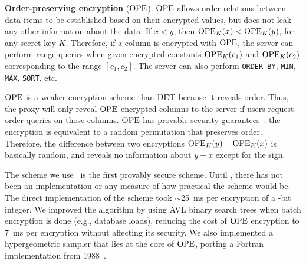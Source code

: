 \textbf{Order-preserving encryption} ($\textrm{OPE}$)\@. $\textrm{OPE}$ allows order
relations between data items to be established based on their
encrypted values, but does not leak any other information about the
data. If $x < y$, then $\textrm{OPE}_K(x) < \textrm{OPE}_K(y)$, for any secret key $K$\@.
Therefore, if a column is encrypted with $\textrm{OPE}$, the server can
perform range queries when given encrypted constants $\textrm{OPE}_K(c_1)$ and
$\textrm{OPE}_K(c_2)$ corresponding to the range $[c_1, c_2]$.  The server can
also perform {\tt ORDER BY}, {\tt MIN}, {\tt MAX}, {\tt SORT}, etc.

$\textrm{OPE}$ is a weaker encryption scheme than $\textrm{DET}$ because it reveals
order.  Thus, the \name{} proxy will only reveal $\textrm{OPE}$-encrypted
columns to the server if users request order queries on those
columns. $\textrm{OPE}$ has provable security guarantees~\cite{boldyreva-ope}: the encryption is
equivalent to a random permutation that preserves order.  Therefore,
the difference between two encryptions $\textrm{OPE}_K(y) - \textrm{OPE}_K(x)$ is
basically random, and reveals no information about $y - x$ except for
the sign.

The scheme we use~\cite{boldyreva-ope} is the first provably secure
scheme.  Until \name{}, there has not been an implementation or any
measure of how practical the scheme would be.  The direct
implementation of the scheme took $\sim$25~ms per encryption of a
-bit integer.  We
improved the algorithm by using AVL binary search trees when batch
encryption is done (e.g., database loads), reducing the cost of $\textrm{OPE}$
encryption to 7~ms per encryption without affecting its security. We
also implemented a hypergeometric sampler that lies at the core of
$\textrm{OPE}$, porting a Fortran implementation from 1988~\cite{HGD88}.




